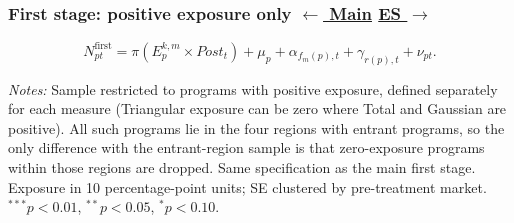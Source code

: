 \documentclass{beamer}
\begin{document}
\begin{frame}[label=sua-fs-lvl-positive]

\frametitle{
    First stage: positive exposure only
    \hfill
    \hyperlink{sua-first-stage}{\scriptsize\color{blue}$\leftarrow$ Main}
    \hyperlink{sua-es-lvl-positive}{\scriptsize\color{blue}ES $\rightarrow$}
}

\centering

\vspace{-0.2cm}

{\small
\begin{equation*}
N^{\mathrm{first}}_{pt}
=
\pi
\left(
E^{k,m}_{p}\times Post_t
\right)
+\mu_p
+\alpha_{f_m(p),t}
+\gamma_{r(p),t}
+\nu_{pt}.
\end{equation*}
}

\vspace{-0.3cm}

\resizebox{0.62\textwidth}{!}{}

\vspace{0.05cm}

\parbox{0.97\textwidth}{%
\tiny
\textit{Notes:}
Sample restricted to programs with positive exposure, defined separately for each measure (Triangular exposure can be zero where Total and Gaussian are positive). All such programs lie in the four regions with entrant programs, so the only difference with the entrant-region sample is that zero-exposure programs within those regions are dropped.
Same specification as the main first stage. Exposure in 10 percentage-point units; SE clustered by pre-treatment market.
$^{***}p<0.01$, $^{**}p<0.05$, $^{*}p<0.10$.
}

\end{frame}
\end{document}
